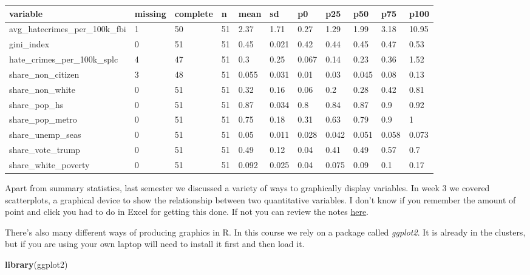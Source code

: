 \documentclass[]{book}
\newenvironment{Shaded}{\begin{snugshade}}{\end{snugshade}}
\newcommand{\KeywordTok}[1]{\textcolor[rgb]{0.13,0.29,0.53}{\textbf{#1}}}
\newcommand{\NormalTok}[1]{#1}
\theoremstyle{definition}
\theoremstyle{definition}
\theoremstyle{definition}
\theoremstyle{remark}
\begin{document}
\begin{tabular}{l|l|l|l|l|l|l|l|l|l|l}
\hline
variable & missing & complete & n & mean & sd & p0 & p25 & p50 & p75 & p100\\
\hline
avg\_hatecrimes\_per\_100k\_fbi & 1 & 50 & 51 & 2.37 & 1.71 & 0.27 & 1.29 & 1.99 & 3.18 & 10.95\\
\hline
gini\_index & 0 & 51 & 51 & 0.45 & 0.021 & 0.42 & 0.44 & 0.45 & 0.47 & 0.53\\
\hline
hate\_crimes\_per\_100k\_splc & 4 & 47 & 51 & 0.3 & 0.25 & 0.067 & 0.14 & 0.23 & 0.36 & 1.52\\
\hline
share\_non\_citizen & 3 & 48 & 51 & 0.055 & 0.031 & 0.01 & 0.03 & 0.045 & 0.08 & 0.13\\
\hline
share\_non\_white & 0 & 51 & 51 & 0.32 & 0.16 & 0.06 & 0.2 & 0.28 & 0.42 & 0.81\\
\hline
share\_pop\_hs & 0 & 51 & 51 & 0.87 & 0.034 & 0.8 & 0.84 & 0.87 & 0.9 & 0.92\\
\hline
share\_pop\_metro & 0 & 51 & 51 & 0.75 & 0.18 & 0.31 & 0.63 & 0.79 & 0.9 & 1\\
\hline
share\_unemp\_seas & 0 & 51 & 51 & 0.05 & 0.011 & 0.028 & 0.042 & 0.051 & 0.058 & 0.073\\
\hline
share\_vote\_trump & 0 & 51 & 51 & 0.49 & 0.12 & 0.04 & 0.41 & 0.49 & 0.57 & 0.7\\
\hline
share\_white\_poverty & 0 & 51 & 51 & 0.092 & 0.025 & 0.04 & 0.075 & 0.09 & 0.1 & 0.17\\
\hline
\end{tabular}

Apart from summary statistics, last semester we discussed a variety of
ways to graphically display variables. In week 3 we covered
scatterplots, a graphical device to show the relationship between two
quantitative variables. I don't know if you remember the amount of point
and click you had to do in Excel for getting this done. If not you can
review the notes
\href{https://rawgit.com/maczokni/MSCD/master/Lesson_3.html\#visualising-the-differences-between-groups}{here}.

There's also many different ways of producing graphics in R. In this
course we rely on a package called \emph{ggplot2}. It is already in the
clusters, but if you are using your own laptop will need to install it
first and then load it.

\begin{Shaded}
\begin{Highlighting}[]
\KeywordTok{library}\NormalTok{(ggplot2)}
\end{Highlighting}
\end{Shaded}
\end{document}
